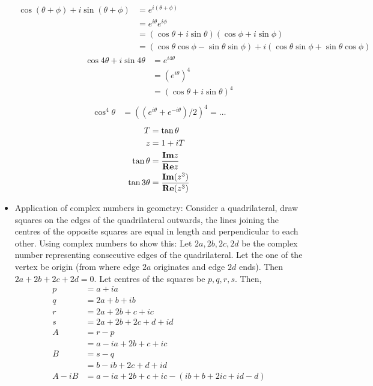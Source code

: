 \documentclass[12pt]{article}
\def\mf{\ensuremath\mathbf}
\begin{document}
\begin{itemize}
    \begin{align*}
        \cos(\theta+\phi) + i\sin(\theta+\phi) &= e^{i(\theta+\phi)}\\
        &= e^{i\theta}e^{i\phi}\\
        &= (\cos\theta+i\sin\theta)(\cos\phi+i\sin\phi)\\
        &= (\cos\theta\cos\phi - \sin\theta\sin\phi) + i(\cos\theta\sin\phi + \sin\theta\cos\phi)
    \end{align*}
    \begin{align*}
        \cos 4\theta+i\sin 4\theta &= e^{i4\theta}\\
        &= (e^{i\theta})^{4}\\
        &= (\cos\theta+i\sin\theta)^4\\
    \end{align*}
    \begin{align*}
        \cos^4\theta &= ((e^{i\theta}+e^{-i\theta})/2)^4 = \ldots
    \end{align*}
    \begin{align*}
        T &= \tan\theta\\
        z &= 1+iT\\
        \tan\theta &= \frac{\mf{Im} z}{\mf{Re} z}\\
        \tan 3\theta &= \frac{\mf{Im}(z^3)}{\mf{Re}(z^3)}
    \end{align*}
    \item Application of complex numbers in geometry: Consider a quadrilateral, draw squares on the edges of the quadrilateral outwards, the lines joining the centres of the opposite squares are equal in length and perpendicular to each other. Using complex numbers to show this: Let $2a,2b,2c,2d$ be the complex number representing consecutive edges of the quadrilateral. Let the one of the vertex be origin (from where edge $2a$ originates and edge $2d$ ends). Then $2a+2b+2c+2d = 0$. Let centres of the squares be $p,q,r,s$. Then,
    \begin{align*}
        p &= a+ia\\
        q &= 2a+b+ib\\
        r &= 2a+2b+c+ic\\
        s &= 2a+2b+2c+d+id\\
        A &= r-p\\
        &= a-ia +2b+c+ic\\
        B &= s-q\\
        &= b -ib + 2c+d+id\\
        A-iB &= a-ia+2b+c+ic-(ib + b +2ic + id -d)\\

\end{align*}
\end{itemize}
\end{document}
